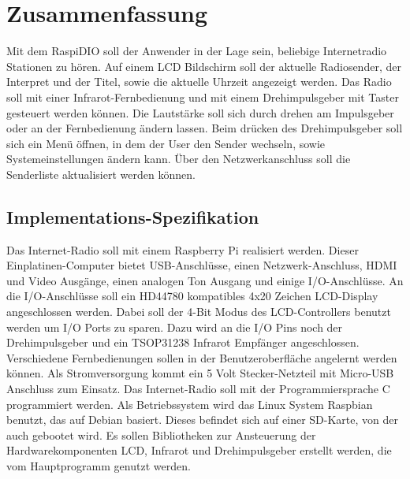 \section{Zusammenfassung}
Mit dem RaspiDIO soll der Anwender in der Lage sein, beliebige Internetradio Stationen zu hören. Auf einem LCD Bildschirm soll der aktuelle Radiosender, der Interpret und der Titel, sowie die aktuelle Uhrzeit angezeigt werden.
\newline
Das Radio soll mit einer Infrarot-Fernbedienung und mit einem Drehimpulsgeber mit Taster gesteuert werden können.
\newline
Die Lautstärke soll sich durch drehen am Impulsgeber oder an der Fernbedienung ändern lassen. Beim drücken des Drehimpulsgeber soll sich ein Menü öffnen, in dem der User den Sender wechseln, sowie Systemeinstellungen ändern kann.
Über den Netzwerkanschluss soll die Senderliste aktualisiert werden können.


\subsection{Implementations-Spezifikation}
Das Internet-Radio soll mit einem Raspberry Pi realisiert werden. Dieser Einplatinen-Computer bietet USB-Anschlüsse, einen Netzwerk-Anschluss, HDMI und Video Ausgänge, einen analogen Ton Ausgang und einige I/O-Anschlüsse.
An die I/O-Anschlüsse soll ein HD44780 kompatibles 4x20 Zeichen LCD-Display angeschlossen werden. Dabei soll der 4-Bit Modus des LCD-Controllers benutzt werden um I/O Ports zu sparen.
\newline
Dazu wird an die I/O Pins noch der Drehimpulsgeber und ein TSOP31238 Infrarot Empfänger angeschlossen.
\newline
Verschiedene Fernbedienungen sollen in der Benutzeroberfläche angelernt werden können.
\newline
Als Stromversorgung kommt ein 5 Volt Stecker-Netzteil mit Micro-USB Anschluss zum Einsatz.
\newline
Das Internet-Radio soll mit der Programmiersprache C programmiert werden. Als Betriebssystem wird das Linux System Raspbian benutzt, das auf Debian basiert. Dieses befindet sich auf einer SD-Karte, von der auch gebootet wird.
\newline
Es sollen Bibliotheken zur Ansteuerung der Hardwarekomponenten LCD, Infrarot und Drehimpulsgeber erstellt werden, die vom Hauptprogramm genutzt werden.